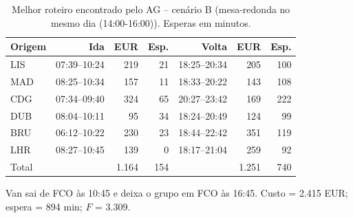 \begin{table}[!t]
\centering
\footnotesize
\setlength{\tabcolsep}{3.5pt}
\caption{Melhor roteiro encontrado pelo AG -- cenário B (mesa-redonda no mesmo dia (14:00-16:00)). Esperas em minutos.}
\label{tab:a1_best_B}
\begin{tabular}{@{}lrrrrrr@{}}
\toprule
Origem & Ida & EUR & Esp. & Volta & EUR & Esp. \\
\midrule
LIS & 07:39--10:24 & 219 & 21 & 18:25--20:34 & 205 & 100 \\
MAD & 08:25--10:34 & 157 & 11 & 18:33--20:22 & 143 & 108 \\
CDG & 07:34--09:40 & 324 & 65 & 20:27--23:42 & 169 & 222 \\
DUB & 08:04--10:11 & 95 & 34 & 18:24--20:49 & 124 & 99 \\
BRU & 06:12--10:22 & 230 & 23 & 18:44--22:42 & 351 & 119 \\
LHR & 08:27--10:45 & 139 & 0 & 18:17--21:04 & 259 & 92 \\
\midrule
Total &  & 1.164 & 154 &  & 1.251 & 740 \\
\bottomrule
\end{tabular}
\par\smallskip\parbox{0.95\linewidth}{\scriptsize Van sai de FCO às 10:45 e deixa o grupo em FCO às 16:45. Custo = 2.415 EUR; espera = 894 min; $F$ = 3.309.}
\end{table}

